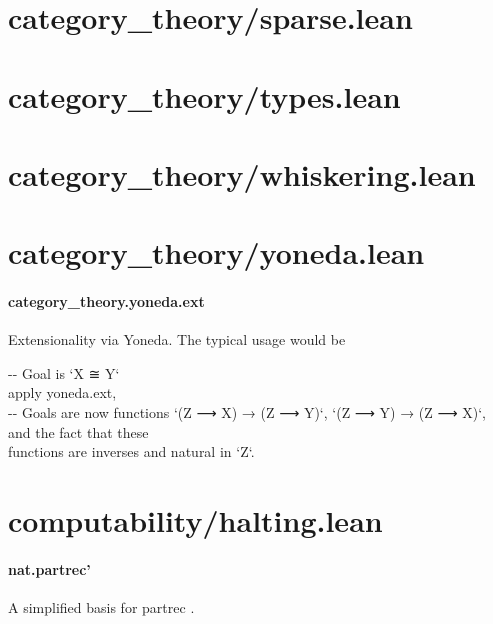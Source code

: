 \documentclass{article}
\begin{document}
\section{category\_theory/sparse.lean}\section{category\_theory/types.lean}\section{category\_theory/whiskering.lean}\section{category\_theory/yoneda.lean}\paragraph{category\_theory.yoneda.ext}
\par
Extensionality via Yoneda. The typical usage would be
\\
\colorbox[RGB]{253,246,227}{\parbox{4.5in}{{{{\color[RGB]{147, 161, 161} -{}- }}}{{{\color[RGB]{147, 161, 161}  Goal is `X ≅ Y` }}}{{{\color[RGB]{101, 123, 131} 
 }}}\\
{{{\color[RGB]{101, 123, 131} apply yoneda.ext,
 }}}\\
{{{\color[RGB]{147, 161, 161} -{}- }}}{{{\color[RGB]{147, 161, 161}  Goals are now functions `(Z ⟶ X) → (Z ⟶ Y)`, `(Z ⟶ Y) → (Z ⟶ X)`, and the fact that these }}}{{{\color[RGB]{101, 123, 131} 
 }}}\\
{{{\color[RGB]{101, 123, 131} functions are inverses and natural  }}}{{{\color[RGB]{133, 153, 0} in }}}{{{\color[RGB]{101, 123, 131}  `Z`.
 }}}\\

}}\section{computability/halting.lean}\paragraph{nat.partrec'}
\par
A simplified basis for 
\colorbox[RGB]{253,246,227}{{{{\color[RGB]{101, 123, 131} partrec }}}}.
\end{document}
